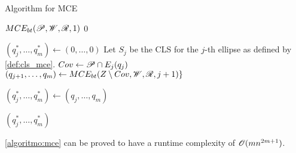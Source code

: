\begin{algorithm}
	\caption{Algorithm for MCE}\label{algoritmo:mce}
	
	\begin{algorithmic}[1]
		
		
		\item[]
		\State \Return $MCE_{bt}(\mathscr{P}, \mathscr{W}, \mathscr{R}, 1)$
		\EndProcedure
		\State
		\State \Return $0$
		\EndIf
		
		\State $(q_j^*, \dots, q_m^*) \gets (0, \dots, 0)$
		\State Let $S_j$ be the CLS for the $j$-th ellipse as defined by \autoref{def:cls_mce}.
		\State $Cov \gets \mathscr{P} \cap E_j(q_j)$
		\State $(q_{j+1}, \dots, q_m) \gets MCE_{bt}(Z \setminus Cov, \mathscr{W}, \mathscr{R}, j+1)\}$
		
		\State $(q_j^*, \dots, q_m^*) \gets(q_j, \dots, q_m)$
		\EndIf
		\EndFor
		
		\State \Return $(q_j^*, \dots, q_m^*)$
		\EndProcedure
	\end{algorithmic}
\end{algorithm}

\autoref{algoritmo:mce} can be proved to have a runtime complexity of $\mathscr{O}(mn^{2m+1})$.